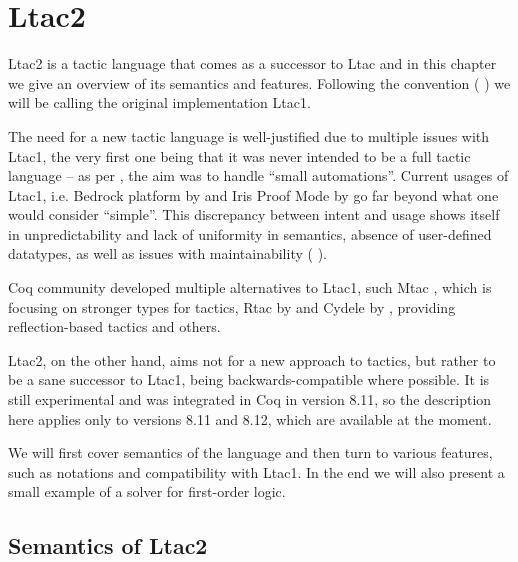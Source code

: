\chapter{Ltac2}

Ltac2 is a tactic language that comes as a successor to Ltac and in this chapter we give an overview of its semantics and features.
Following the convention (\cite[Section 3.3.2]{thecoqdevelopmentteamCoqProofAssistant2020} \cite{pedrotLtac2TacticalWarfare2019}) we will be calling the original implementation Ltac1.

The need for a new tactic language is well-justified due to multiple issues with Ltac1, the very first one being that it was never intended to be a full tactic language -- as per \citet{pedrotCoqHoTTminuteTickingClockwork2016}, the aim was to handle ``small automations''.
Current usages of Ltac1, i.e. Bedrock platform by \citet{chlipalaMostlyautomatedVerificationLowlevel2011} and Iris Proof Mode by \citet{krebbersInteractiveProofsHigherorder2017, krebbersMoSeLGeneralExtensible2018} go far beyond what one would consider ``simple''.
This discrepancy between intent and usage shows itself in unpredictability and lack of uniformity in semantics, absence of user-defined datatypes, as well as issues with maintainability (\cite[Section 3.3.2]{thecoqdevelopmentteamCoqProofAssistant2020} \cite{pedrotLtac2TacticalWarfare2019}).

Coq community developed multiple alternatives to Ltac1, such Mtac \cite*{zilianiMtacMonadTyped2013, kaiserMtac2TypedTactics2018a}, which is focusing on stronger types for tactics,
Rtac by \citet{malechaExtensibleEfficientAutomation2016} and Cydele by \citet{claretLightweightProofReflection2013}, providing reflection-based tactics and others.

Ltac2, on the other hand, aims not for a new approach to tactics, but rather to be a sane successor to Ltac1, being backwards-compatible where possible.
It is still experimental and was integrated in Coq in version 8.11, so the description here applies only to versions 8.11 and 8.12, which are available at the moment.

We will first cover semantics of the language and then turn to various features, such as notations and compatibility with Ltac1.
In the end we will also present a small example of a solver for first-order logic.

\section{Semantics of Ltac2}

